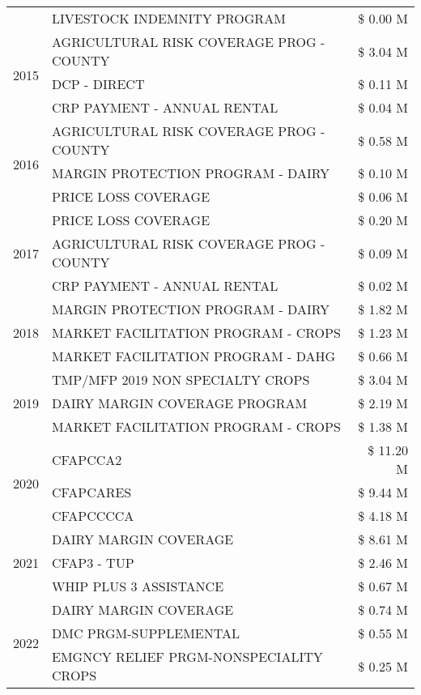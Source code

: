 \begin{tabular}{llr}
 & LIVESTOCK INDEMNITY PROGRAM & \$ 0.00 M \\
\cline{1-3}
\multirow[t]{3}{*}{2015} & AGRICULTURAL RISK COVERAGE PROG - COUNTY & \$ 3.04 M \\
 & DCP - DIRECT & \$ 0.11 M \\
 & CRP PAYMENT - ANNUAL RENTAL & \$ 0.04 M \\
\cline{1-3}
\multirow[t]{3}{*}{2016} & AGRICULTURAL RISK COVERAGE PROG - COUNTY & \$ 0.58 M \\
 & MARGIN PROTECTION PROGRAM - DAIRY & \$ 0.10 M \\
 & PRICE LOSS COVERAGE & \$ 0.06 M \\
\cline{1-3}
\multirow[t]{3}{*}{2017} & PRICE LOSS COVERAGE & \$ 0.20 M \\
 & AGRICULTURAL RISK COVERAGE PROG - COUNTY & \$ 0.09 M \\
 & CRP PAYMENT - ANNUAL RENTAL & \$ 0.02 M \\
\cline{1-3}
\multirow[t]{3}{*}{2018} & MARGIN PROTECTION PROGRAM - DAIRY & \$ 1.82 M \\
 & MARKET FACILITATION PROGRAM - CROPS & \$ 1.23 M \\
 & MARKET FACILITATION PROGRAM - DAHG & \$ 0.66 M \\
\cline{1-3}
\multirow[t]{3}{*}{2019} & TMP/MFP 2019 NON SPECIALTY CROPS & \$ 3.04 M \\
 & DAIRY MARGIN COVERAGE PROGRAM & \$ 2.19 M \\
 & MARKET FACILITATION PROGRAM - CROPS & \$ 1.38 M \\
\cline{1-3}
\multirow[t]{3}{*}{2020} & CFAPCCA2 & \$ 11.20 M \\
 & CFAPCARES & \$ 9.44 M \\
 & CFAPCCCCA & \$ 4.18 M \\
\cline{1-3}
\multirow[t]{3}{*}{2021} & DAIRY MARGIN COVERAGE & \$ 8.61 M \\
 & CFAP3 - TUP & \$ 2.46 M \\
 & WHIP PLUS 3 ASSISTANCE & \$ 0.67 M \\
\cline{1-3}
\multirow[t]{3}{*}{2022} & DAIRY MARGIN COVERAGE & \$ 0.74 M \\
 & DMC PRGM-SUPPLEMENTAL & \$ 0.55 M \\
 & EMGNCY RELIEF PRGM-NONSPECIALITY CROPS & \$ 0.25 M \\
\cline{1-3}
\bottomrule
\end{tabular}

